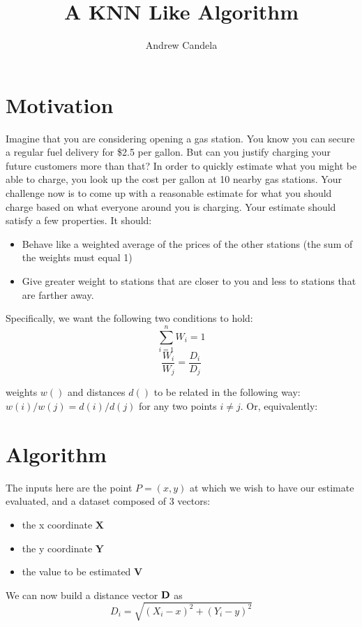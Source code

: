 \documentclass[11pt, oneside]{article}   	%
\title{A KNN Like Algorithm}
\author{Andrew Candela}
\begin{document}
\maketitle
\section*{Motivation}Imagine that you are considering opening a gas station. You know you can secure a regular fuel delivery for \$2.5 per gallon. But can you justify charging your future customers more than that? In order to quickly estimate what you might be able to charge, you look up the cost per gallon at 10 nearby gas stations. Your challenge now is to come up with a reasonable estimate for what you should charge based on what everyone around you is charging.
Your estimate should satisfy a few properties. It should:
\begin{itemize}
\item{Behave like a weighted average of the prices of the other stations (the sum of the weights must equal 1)}
\item{Give greater weight to stations that are closer to you and less to stations that are farther away.}
\end{itemize}
Specifically, we want the following two conditions to hold:
\begin{equation}
\sum_{i=1}^n W_i = 1
\end{equation}
\begin{equation}
\frac{W_i}{W_j}=\frac{D_i}{D_j}
\end{equation}

weights $w()$ and distances $d()$ to be related in the following way: $w(i)/w(j) = d(i)/d(j)$ for any two points $i \neq j$. Or, equivalently: \[\]


\section*{Algorithm}
The inputs here are the point $P=(x,y)$ at which we wish to have our estimate evaluated, and a dataset composed of 3 vectors: 
\begin{itemize}
\item{the x coordinate $\bm{X}$} 
\item{the y coordinate $\bm{Y}$} 
\item{the value to be estimated $\bm{V}$}
\end{itemize}
We can now build a distance vector $\bf{D}$ as 
\[
D_i=\sqrt{(X_i - x)^2+(Y_i - y)^2}
\]
\end{document}
